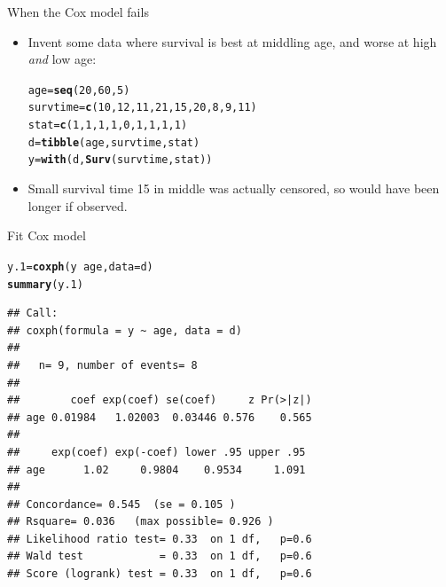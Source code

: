 \documentclass[unknownkeysallowed]{beamer}\usepackage[]{graphicx}\usepackage[]{color}
\makeatletter
\newcommand{\hlnum}[1]{\textcolor[rgb]{0.686,0.059,0.569}{#1}}%
\newcommand{\hlopt}[1]{\textcolor[rgb]{0,0,0}{#1}}%
\newcommand{\hlstd}[1]{\textcolor[rgb]{0.345,0.345,0.345}{#1}}%
\newcommand{\hlkwb}[1]{\textcolor[rgb]{0.69,0.353,0.396}{#1}}%
\newcommand{\hlkwc}[1]{\textcolor[rgb]{0.333,0.667,0.333}{#1}}%
\newcommand{\hlkwd}[1]{\textcolor[rgb]{0.737,0.353,0.396}{\textbf{#1}}}%
\newenvironment{kframe}{%
 \def\at@end@of@kframe{}%
 \ifinner\ifhmode%
  \def\at@end@of@kframe{\end{minipage}}%
  \begin{minipage}{\columnwidth}%
 \fi\fi%
 \def\FrameCommand##1{\hskip\@totalleftmargin \hskip-\fboxsep
 \colorbox{shadecolor}{##1}\hskip-\fboxsep
     \hskip-\linewidth \hskip-\@totalleftmargin \hskip\columnwidth}%
 \MakeFramed {\advance\hsize-\width
   \@totalleftmargin\z@ \linewidth\hsize
   \@setminipage}}%
 {\par\unskip\endMakeFramed%
 \at@end@of@kframe}
\newenvironment{knitrout}{}{} %
\makeatother
\begin{document}
\begin{frame}[fragile]{When the Cox model fails}
  \begin{itemize}
  \item Invent some data where survival is best at middling age, and
    worse at high \emph{and} low age:

\begin{knitrout}
\color{fgcolor}\begin{kframe}
\begin{alltt}
\hlstd{age}\hlkwb{=}\hlkwd{seq}\hlstd{(}\hlnum{20}\hlstd{,}\hlnum{60}\hlstd{,}\hlnum{5}\hlstd{)}
\hlstd{survtime}\hlkwb{=}\hlkwd{c}\hlstd{(}\hlnum{10}\hlstd{,}\hlnum{12}\hlstd{,}\hlnum{11}\hlstd{,}\hlnum{21}\hlstd{,}\hlnum{15}\hlstd{,}\hlnum{20}\hlstd{,}\hlnum{8}\hlstd{,}\hlnum{9}\hlstd{,}\hlnum{11}\hlstd{)}
\hlstd{stat}\hlkwb{=}\hlkwd{c}\hlstd{(}\hlnum{1}\hlstd{,}\hlnum{1}\hlstd{,}\hlnum{1}\hlstd{,}\hlnum{1}\hlstd{,}\hlnum{0}\hlstd{,}\hlnum{1}\hlstd{,}\hlnum{1}\hlstd{,}\hlnum{1}\hlstd{,}\hlnum{1}\hlstd{)}
\hlstd{d}\hlkwb{=}\hlkwd{tibble}\hlstd{(age,survtime,stat)}
\hlstd{y}\hlkwb{=}\hlkwd{with}\hlstd{(d,}\hlkwd{Surv}\hlstd{(survtime,stat))}
\end{alltt}
\end{kframe}
\end{knitrout}

\item Small survival time 15 in middle was actually censored, so would
  have been longer if observed.
  \end{itemize}
\end{frame}

\begin{frame}[fragile]{Fit Cox model}
  
  \begin{footnotesize}
\begin{knitrout}
\color{fgcolor}\begin{kframe}
\begin{alltt}
\hlstd{y.1}\hlkwb{=}\hlkwd{coxph}\hlstd{(y}\hlopt{~}\hlstd{age,}\hlkwc{data}\hlstd{=d)}
\hlkwd{summary}\hlstd{(y.1)}
\end{alltt}
\begin{verbatim}
## Call:
## coxph(formula = y ~ age, data = d)
## 
##   n= 9, number of events= 8 
## 
##        coef exp(coef) se(coef)     z Pr(>|z|)
## age 0.01984   1.02003  0.03446 0.576    0.565
## 
##     exp(coef) exp(-coef) lower .95 upper .95
## age      1.02     0.9804    0.9534     1.091
## 
## Concordance= 0.545  (se = 0.105 )
## Rsquare= 0.036   (max possible= 0.926 )
## Likelihood ratio test= 0.33  on 1 df,   p=0.6
## Wald test            = 0.33  on 1 df,   p=0.6
## Score (logrank) test = 0.33  on 1 df,   p=0.6
\end{verbatim}
\end{kframe}
\end{knitrout}
    
  \end{footnotesize}
  
\end{frame}
\end{document}
